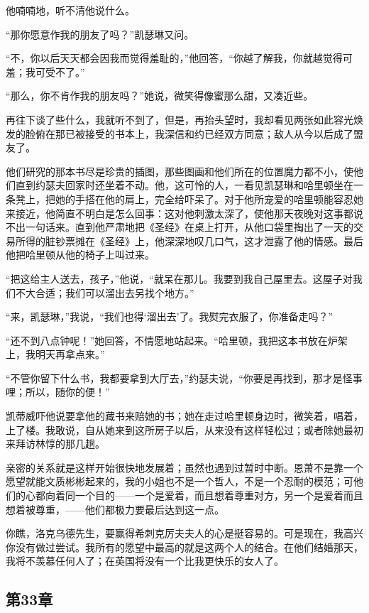 \par 他喃喃地，听不清他说什么。
\par “那你愿意作我的朋友了吗？”凯瑟琳又问。
\par “不，你以后天天都会因我而觉得羞耻的，”他回答，“你越了解我，你就越觉得可羞；我可受不了。”
\par “那么，你不肯作我的朋友吗？”她说，微笑得像蜜那么甜，又凑近些。
\par 再往下谈了些什么，我就听不到了，但是，再抬头望时，我却看见两张如此容光焕发的脸俯在那已被接受的书本上，我深信和约已经双方同意；敌人从今以后成了盟友了。
\par 他们研究的那本书尽是珍贵的插图，那些图画和他们所在的位置魔力都不小，使他们直到约瑟夫回家时还坐着不动。他，这可怜的人，一看见凯瑟琳和哈里顿坐在一条凳上，把她的手搭在他的肩上，完全给吓呆了。对于他所宠爱的哈里顿能容忍她来接近，他简直不明白是怎么回事：这对他刺激太深了，使他那天夜晚对这事都说不出一句话来。直到他严肃地把《圣经》在桌上打开，从他口袋里掏出了一天的交易所得的脏钞票摊在《圣经》上，他深深地叹几口气，这才泄露了他的情感。最后他把哈里顿从他的椅子上叫过来。
\par “把这给主人送去，孩子，”他说，“就呆在那儿。我要到我自己屋里去。这屋子对我们不大合适；我们可以溜出去另找个地方。”
\par “来，凯瑟琳，”我说，“我们也得‘溜出去’了。我熨完衣服了，你准备走吗？”
\par “还不到八点钟呢！”她回答，不情愿地站起来。“哈里顿，我把这本书放在炉架上，我明天再拿点来。”
\par “不管你留下什么书，我都要拿到大厅去，”约瑟夫说，“你要是再找到，那才是怪事哩；所以，随你的便！”
\par 凯蒂威吓他说要拿他的藏书来赔她的书；她在走过哈里顿身边时，微笑着，唱着，上了楼。我敢说，自从她来到这所房子以后，从来没有这样轻松过；或者除她最初来拜访林惇的那几趟。
\par 亲密的关系就是这样开始很快地发展着；虽然也遇到过暂时中断。恩萧不是靠一个愿望就能文质彬彬起来的，我的小姐也不是一个哲人，不是一个忍耐的模范；可他们的心都向着同一个目的——一个是爱着，而且想着尊重对方，另一个是爱着而且想着被尊重，——他们都极力要最后达到这一点。
\par 你瞧，洛克乌德先生，要赢得希刺克厉夫夫人的心是挺容易的。可是现在，我高兴你没有做过尝试。我所有的愿望中最高的就是这两个人的结合。在他们结婚那天，我将不羡慕任何人了；在英国将没有一个比我更快乐的女人了。


\subsection{第33章}


